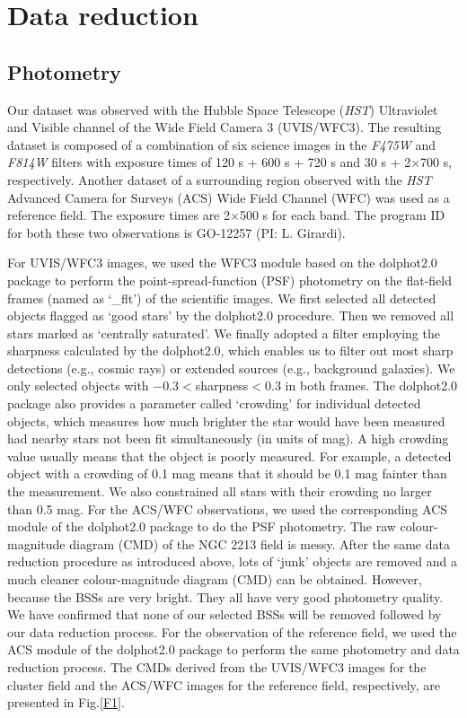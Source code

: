 \documentclass[useAMS,usenatbib,twocolumn]{mnras}
\begin{document}
\section{Data reduction}\label{S2}
\subsection{Photometry}
Our dataset was observed with the Hubble Space Telescope ({\sl HST}) Ultraviolet and Visible channel of the Wide Field Camera 3 (UVIS/WFC3). The resulting dataset is composed of a combination of six science images in the {\sl F475W} and {\sl F814W} filters with exposure times of 120 s + 600 s + 720 s and  30 s + 2$\times$700 s, respectively. Another dataset of a surrounding region  observed with the {\sl HST} Advanced Camera for Surveys (ACS) Wide Field Channel (WFC) was used as a reference field. The exposure times are 2$\times$500 s for each band. The program ID for both these two observations is GO-12257 (PI: L. Girardi). 

For UVIS/WFC3 images, we used the WFC3 module based on the {\sc dolphot2.0} package \citep{Dolp11a,Dolp13a} to perform the point-spread-function (PSF) photometry on the flat-field frames (named as `\_flt') of the scientific images. We first selected all detected objects flagged as `good stars' by the {\sc dolphot2.0} procedure. Then we removed all stars marked as `centrally saturated'. We finally adopted a filter employing the sharpness calculated by the {\sc dolphot2.0}, which enables us to filter out most sharp detections (e.g., cosmic rays) or extended sources (e.g., background galaxies). We only selected objects with $-0.3<$sharpness$<0.3$ in both frames. The {\sc dolphot2.0} package also provides a parameter called `crowding' for individual detected objects, which measures how much brighter the star would have been measured had nearby stars not been fit simultaneously (in units of mag). A high crowding value usually means that the object is poorly measured. For example, a detected object with a crowding of 0.1 mag means that it should be 0.1 mag fainter than the measurement. We also constrained all stars with their crowding no larger than 0.5 mag. For the ACS/WFC observations, we used the corresponding ACS module of the {\sc dolphot2.0} package to do the PSF photometry. The raw colour-magnitude diagram (CMD) of the NGC 2213 field is messy. After the same data reduction procedure as introduced above, lots of `junk' objects are removed and a much cleaner colour-magnitude diagram (CMD) can be obtained. However, because the BSSs are very bright. They all have very good photometry quality. We have confirmed that none of our selected BSSs will be removed followed by our data reduction process. For the observation of the reference field, we used the ACS module of the {\sc dolphot2.0} package to perform the same photometry and data reduction process. The CMDs derived from the UVIS/WFC3 images for the cluster field and the ACS/WFC images for the reference field, respectively, are presented in Fig.\ref{F1}.
\end{document}
